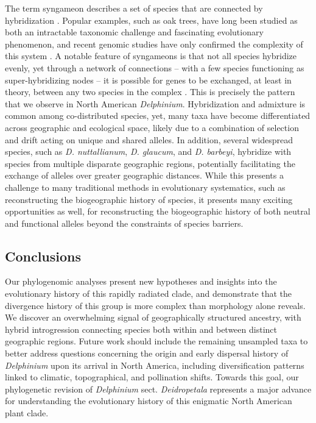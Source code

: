 \documentclass[11pt]{article}
\begin{document}
The term syngameon describes a set of species that are connected
by hybridization \citep{boecklen_topology_2017}. Popular examples, such as oak trees, have long been studied as both an intractable taxonomic challenge and fascinating evolutionary phenomenon, 
and recent genomic studies have only confirmed the complexity of this system \citep{eaton_historical_2015, hipp_genomic_2020, ribicoff_introgression_nodate}. 
% 
A notable feature of syngameons is that not all species hybridize evenly, yet through a network of connections -- with a few
species functioning as super-hybridizing nodes -- it is possible for genes to be exchanged, at least in theory, between any two species in the complex \citep{boecklen_topology_2017}.
% 
This is precisely the pattern that we observe in North American 
\emph{Delphinium}. Hybridization and admixture is common among co-distributed species, yet, many taxa have become differentiated across geographic and ecological space, likely due to a combination of selection and drift acting on unique and shared alleles. In addition, several widespread species, such as \emph{D. nuttallianum}, \emph{D. glaucum}, and \emph{D. barbeyi}, hybridize with species from multiple disparate geographic regions, potentially facilitating the exchange of alleles over greater geographic distances. 
% 
While this presents a challenge to many traditional methods in evolutionary systematics, such as reconstructing the biogeographic history of species, it presents many exciting opportunities as well, for reconstructing the biogeographic history of both neutral and functional alleles beyond the constraints of species barriers.
% 

\subsection{Conclusions}
Our phylogenomic analyses present new hypotheses and insights into the evolutionary
history of this rapidly radiated clade, and demonstrate that the divergence history
of this group is more complex than morphology alone reveals. 
% 
We discover an overwhelming signal of geographically structured ancestry, 
with hybrid introgression connecting species both within and between distinct geographic regions.
% 
Future work should include the remaining unsampled taxa to better address questions concerning the origin and early dispersal history of \emph{Delphinium} upon its arrival in North America, including diversification patterns linked to climatic, topographical, and pollination shifts. Towards this goal, our phylogenetic revision of \emph{Delphinium} sect. \emph{Deidropetala} represents a major advance for understanding  the evolutionary history of this enigmatic North American plant clade.
\end{document}
